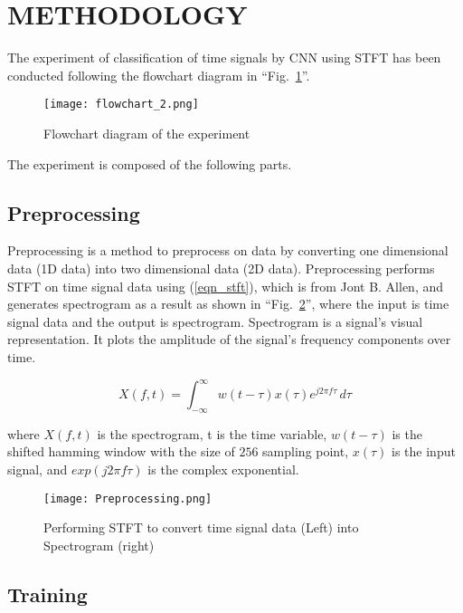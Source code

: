 \documentclass[conference]{IEEEtran}
\begin{document}
\section{METHODOLOGY}

The experiment of classification of time signals by CNN using STFT has been conducted following the flowchart diagram in ``Fig.~\ref{fig_flowchart}''.

\begin{figure}[htbp]
\centerline{\texttt{[image: flowchart\_2.png]}}
\caption{Flowchart diagram of the experiment}
\label{fig_flowchart}
\end{figure}

The experiment is composed of the following parts.

\subsection{Preprocessing}
Preprocessing is a method to preprocess on data by converting one dimensional data (1D data) into two dimensional data (2D data). Preprocessing performs STFT on time signal data using (\ref{eqn_stft}), which is from Jont B. Allen\cite{b3}, and generates spectrogram as a result as shown in ``Fig.~\ref{fig_preprocessing}'', where the input is time signal data and the output is spectrogram. Spectrogram is a signal's visual representation. It plots the amplitude of the signal's frequency components over time. 

\begin{equation}
X(f,t) = \int_{-\infty}^{\infty} w(t-\tau)x(\tau)e^{j2\pi f\tau} \,d\tau \label{eqn_stft}
\end{equation}

where \(X(f, t) \) is the spectrogram, t is the time variable, \(w(t - \tau)\) is the shifted hamming window with the size of \(256\) sampling point, \(x(\tau)\) is the input
signal, and \(exp (j2\pi f\tau)\) is the complex exponential.

\begin{figure}[htbp]
\centerline{\texttt{[image: Preprocessing.png]}}
\caption{Performing STFT to convert time signal data (Left) into Spectrogram (right)}
\label{fig_preprocessing}
\end{figure}


\subsection{Training}
\end{document}
